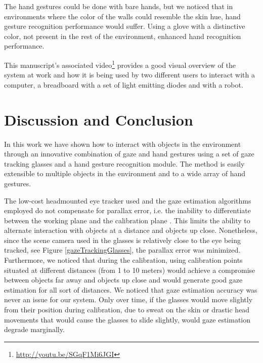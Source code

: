 \documentclass[jou,a4paper,notxfonts]{apa}
\begin{document}
The hand gestures could be done with bare hands, but we noticed that in environments where the color of the walls could
resemble the skin hue, hand gesture recognition performance would suffer. Using a glove with a distinctive color, not 
present in the rest of the environment, enhanced hand recognition performance.

This manuscript's associated video\footnote{\url{http://youtu.be/SGqF1Mi6JGI}} provides a good visual overview of the system at work and how it is being used by two different users to interact with a computer, a breadboard
with a set of light emitting diodes and with a robot.


\section{Discussion and Conclusion}
In this work we have shown how to interact with objects in the environment through an innovative combination of gaze and
hand gestures using a set of gaze tracking glasses and a hand gesture recognition module. The method is easily
extensible to multiple objects in the environment and to a wide array of hand gestures.

The low-cost headmounted eye tracker used and the gaze estimation algorithms employed do not compensate for parallax
error, i.e. the inability to differentiate between the working plane and the calibration plane
\cite{mardanbegi2012parallax}. This limits the ability to alternate interaction with objects at a distance and objects
up close. Nonetheless, since the scene camera used in the glasses is relatively close to the eye being tracked, see Figure
\ref{gazeTrackingGlasses}, the parallax error was minimized. Furthermore, we noticed that during the calibration, using                                                                                                                                                                                                                                                                                                                                                                                                                                 
calibration points situated at different distances (from 1 to 10 meters) would achieve a compromise between objects
far away and objects up close and would generate good gaze estimation for all sort of distances. We noticed that
gaze estimation accuracy was never an issue for our system. Only over time, if the glasses would move slightly from
their position during calibration, due to sweat on the skin or drastic head movements that would cause the glasses to slide slightly, would gaze estimation degrade marginally.
\end{document}
